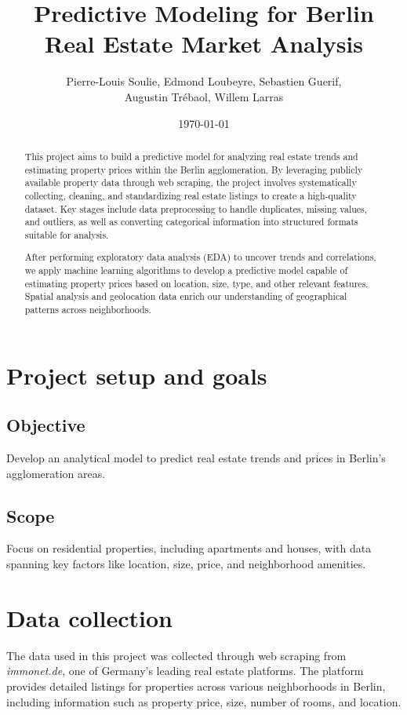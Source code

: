 \documentclass[twocolumn]{article}
\title{Predictive Modeling for Berlin Real Estate Market Analysis}
\author{Pierre-Louis Soulie, Edmond Loubeyre, Sebastien Guerif, 
\\ Augustin Trébaol, Willem Larras}
\date{\today}
\begin{document}
\maketitle

\begin{abstract}
This project aims to build a predictive model for analyzing real estate trends and estimating property prices within the Berlin agglomeration. By leveraging publicly available property data through web scraping, the project involves systematically collecting, cleaning, and standardizing real estate listings to create a high-quality dataset. Key stages include data preprocessing to handle duplicates, missing values, and outliers, as well as converting categorical information into structured formats suitable for analysis.

After performing exploratory data analysis (EDA) to uncover trends and correlations, we apply machine learning algorithms to develop a predictive model capable of estimating property prices based on location, size, type, and other relevant features. Spatial analysis and geolocation data enrich our understanding of geographical patterns across neighborhoods.
\end{abstract}

\section{Project setup and goals}
\subsection{Objective}
Develop an analytical model to predict real estate trends and prices in Berlin's agglomeration areas.

\subsection{Scope}
Focus on residential properties, including apartments and houses, with data spanning key factors like location, size, price, and neighborhood amenities.

\section{Data collection}
The data used in this project was collected through web scraping from \textit{immonet.de}, one of Germany's leading real estate platforms. The platform provides detailed listings for properties across various neighborhoods in Berlin, including information such as property price, size, number of rooms, and location.
\end{document}
